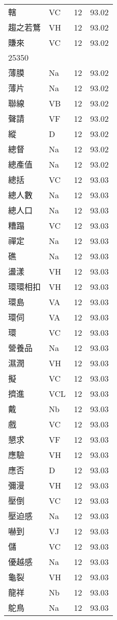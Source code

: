 \documentclass[twocolumn]{book}
\begin{document}
\begin{supertabular}{llrr}
轄 & VC & 12 &  93.02\\
趨之若鶩 & VH & 12 &  93.02\\
賺來 & VC & 12 &  93.02\\
25350\\
薄膜 & Na & 12 &  93.02\\
薄片 & Na & 12 &  93.02\\
聯線 & VB & 12 &  93.02\\
聲請 & VF & 12 &  93.02\\
縱 & D & 12 &  93.02\\
總督 & Na & 12 &  93.02\\
總產值 & Na & 12 &  93.02\\
總括 & VC & 12 &  93.03\\
總人數 & Na & 12 &  93.03\\
總人口 & Na & 12 &  93.03\\
糟蹋 & VC & 12 &  93.03\\
禪定 & Na & 12 &  93.03\\
礁 & Na & 12 &  93.03\\
盪漾 & VH & 12 &  93.03\\
環環相扣 & VH & 12 &  93.03\\
環島 & VA & 12 &  93.03\\
環伺 & VA & 12 &  93.03\\
環 & VC & 12 &  93.03\\
營養品 & Na & 12 &  93.03\\
濕潤 & VH & 12 &  93.03\\
擬 & VC & 12 &  93.03\\
擠進 & VCL & 12 &  93.03\\
戴 & Nb & 12 &  93.03\\
戲 & VC & 12 &  93.03\\
懇求 & VF & 12 &  93.03\\
應驗 & VH & 12 &  93.03\\
應否 & D & 12 &  93.03\\
彌漫 & VH & 12 &  93.03\\
壓倒 & VC & 12 &  93.03\\
壓迫感 & Na & 12 &  93.03\\
嚇到 & VJ & 12 &  93.03\\
儲 & VC & 12 &  93.03\\
優越感 & Na & 12 &  93.03\\
龜裂 & VH & 12 &  93.03\\
龍祥 & Nb & 12 &  93.03\\
鴕鳥 & Na & 12 &  93.03\\

\end{supertabular}
\end{document}
